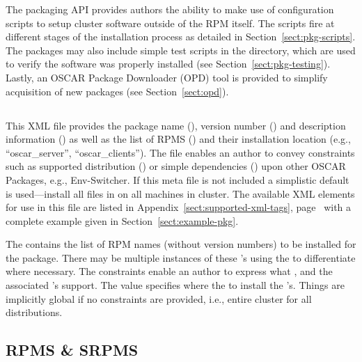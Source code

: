 The packaging API provides authors the ability to make use of configuration
scripts to setup cluster software outside of the RPM itself.  The scripts
fire at different stages of the installation process as detailed in
Section~\ref{sect:pkg-scripts}.  The packages may also include simple test
scripts in the  directory, which are used to verify the
software was properly installed (see Section~\ref{sect:pkg-testing}).
Lastly, an OSCAR Package Downloader (OPD) tool is provided to simplify
acquisition of new packages (see Section~\ref{sect:opd}).




\subsection{}
\label{sect:pkg-config-xml}

This XML file provides the package name (), version number
() and description information () as
well as the list of RPMS () and their installation location
(e.g., ``oscar\_server'', ``oscar\_clients'').   The file enables an author
to convey constraints such as supported distribution () or
simple dependencies () upon other OSCAR Packages, e.g.,
Env-Switcher.  If this meta file is not included a simplistic default is
used---install all files in  on all machines in cluster.
The available XML elements for use in this file are listed in
Appendix~\ref{sect:supported-xml-tags}, page~\pageref{sect:supported-xml-tags}
with a complete example given in Section~\ref{sect:example-pkg}.

The  contains the list of RPM names (without version
numbers) to be installed for the package.  There may be multiple instances
of these 's using the  to differentiate
where necessary.  The  constraints enable an author to
express what ,  and
 the associated 's support.  The
 value specifies where the to install the 's.
Things are implicitly global if no constraints are provided, i.e., entire
cluster for all distributions.  

%


\subsection{RPMS \& SRPMS}
\label{sect:pkg-rpms-srpms}


